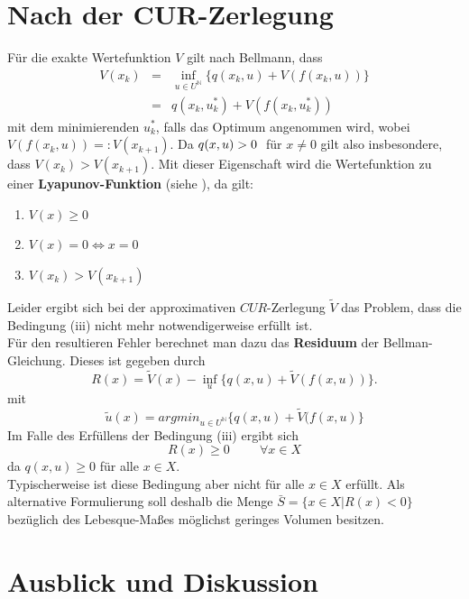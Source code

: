 \documentclass[12pt,a4paper,twoside]{article}
\begin{document}
\section{Nach der CUR-Zerlegung}
	Für die exakte Wertefunktion $V$ gilt nach Bellmann, dass
	\begin{eqnarray*}
		V(x_k)&=&\inf_{u\in U^{\mathds{N}}}\{q(x_k,u)+V(f(x_k,u))\} \\
			&=&q(x_k,u_k^*)+V(f(x_k,u_k^*))
	\end{eqnarray*}
	mit dem minimierenden $u_k^*$, falls das Optimum angenommen wird, wobei $V(f(x_k,u))=:V(x_{k+1})$. Da $q(x,u)>0 \hspace{1mm}$ für $x\neq 0$ gilt also insbesondere, dass $V(x_k)>V(x_{k+1})$. \newline
	\newline
	Mit dieser Eigenschaft wird die Wertefunktion zu einer \textbf{Lyapunov-Funktion} (siehe \citep{Wiggins1990}), da gilt:
	\begin{enumerate}
		\item $V(x)\geq 0$ 
		\item $V(x)=0 \Leftrightarrow x=0$
		\item $V(x_k)>V(x_{k+1})$
	\end{enumerate}
	Leider ergibt sich bei der approximativen $CUR$-Zerlegung $\tilde{V}$ das Problem, dass die Bedingung (iii) nicht 
	mehr notwendigerweise erfüllt ist. \\
	Für den resultieren Fehler berechnet man dazu das \textbf{Residuum} der Bellman-Gleichung. Dieses ist gegeben 
	durch
	\begin{equation}
		R(x)=\tilde{V}(x)-\inf_{u}\{q(x,u)+\tilde{V}(f(x,u))\}.
	\end{equation}
	mit
	\begin{equation}
		\tilde{u}(x)=argmin_{u\in U^{\mathds{N}}}\{q(x,u)+\tilde{V}(f(x,u)\}
	\end{equation}
	Im Falle des Erfüllens der Bedingung (iii) ergibt sich
	\begin{equation}
		R(x)\geq 0 \hspace{1cm}\forall x\in X
	\end{equation}
	da $q(x,u)\geq0$ für alle $x\in X$. \\
	Typischerweise ist diese Bedingung aber nicht für alle $x\in X$ erfüllt. Als alternative Formulierung soll 
	deshalb die Menge $\bar{S}=\{x\in X| R(x)<0\}$ bezüglich des Lebesque-Maßes möglichst geringes Volumen besitzen.
\section{Ausblick und Diskussion}
	\newpage

\end{document}
